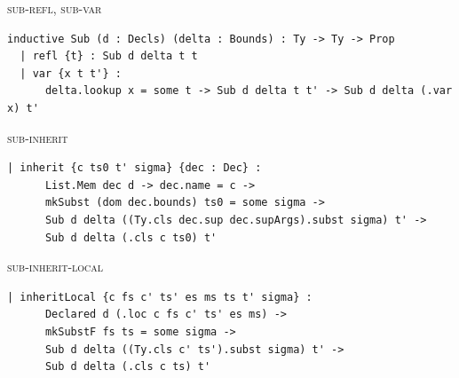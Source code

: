 \begin{cmp}{\textsc{sub-refl}, \textsc{sub-var}}
\begin{paperside}
\qquad
{}
\end{paperside}
\begin{leanside}
\begin{lstlisting}[style=leanside]
inductive Sub (d : Decls) (delta : Bounds) : Ty -> Ty -> Prop
  | refl {t} : Sub d delta t t
  | var {x t t'} :
      delta.lookup x = some t -> Sub d delta t t' -> Sub d delta (.var x) t'
\end{lstlisting}
\end{leanside}
\end{cmp}

\begin{cmp}{\textsc{sub-inherit}}
\begin{paperside}
\end{paperside}
\begin{leanside}
\begin{lstlisting}[style=leanside]
  | inherit {c ts0 t' sigma} {dec : Dec} :
      List.Mem dec d -> dec.name = c ->
      mkSubst (dom dec.bounds) ts0 = some sigma ->
      Sub d delta ((Ty.cls dec.sup dec.supArgs).subst sigma) t' ->
      Sub d delta (.cls c ts0) t'
\end{lstlisting}
\end{leanside}
\end{cmp}

\begin{cmp}{\textsc{sub-inherit-local}}
\begin{paperside}
\end{paperside}
\begin{leanside}
\begin{lstlisting}[style=leanside]
  | inheritLocal {c fs c' ts' es ms ts t' sigma} :
      Declared d (.loc c fs c' ts' es ms) ->
      mkSubstF fs ts = some sigma ->
      Sub d delta ((Ty.cls c' ts').subst sigma) t' ->
      Sub d delta (.cls c ts) t'
\end{lstlisting}
\end{leanside}
\end{cmp}

